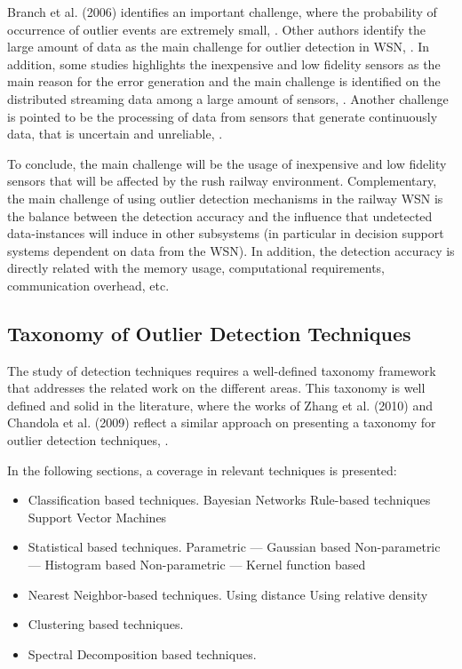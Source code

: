 Branch et al. (2006)  identifies an important challenge, where the probability of occurrence of outlier events are extremely small, \cite{class:branch:2006}. Other authors identify the large amount of data as the main challenge for outlier detection in WSN, \cite{nn:abid:2016, stat:sheng:2007}. In addition, some studies highlights the inexpensive and low fidelity sensors as the main reason for the error generation and the main challenge is identified on the distributed streaming data among a large amount of sensors, \cite{nn:zhuang:2006}. Another challenge is pointed to be  the processing of data from sensors that generate continuously data, that is uncertain and unreliable, \cite{stat:ghorbel:2015}. 

To conclude, the main challenge will be the usage of inexpensive and low fidelity sensors that will be affected by the rush railway environment. Complementary, the main challenge of using outlier detection mechanisms in the railway \ac{WSN} is the balance between the detection accuracy and the influence that undetected data-instances will induce in other subsystems (in particular in decision support systems dependent on data from the \ac{WSN}). In addition, the detection accuracy is directly related with the memory usage, computational requirements, communication overhead, etc. 


\subsection{Taxonomy of Outlier Detection Techniques}
\label{sec:taxon}
The study of detection techniques requires a well-defined taxonomy framework that addresses the related work on the different areas. 
This taxonomy is well defined and solid in the literature, where the works of Zhang et al. (2010) and Chandola et al. (2009) reflect a similar approach on presenting a taxonomy for outlier detection techniques, \cite{gen:zhang:2010, gen:chandola:2009}.

In the following sections, a coverage in relevant techniques is presented:

\begin{itemize}
	\setlength\itemsep{-0.5em}
	\item Classification based techniques.
	\subitem Bayesian Networks
	\subitem Rule-based techniques
	\subitem Support Vector Machines
	
	\item Statistical based techniques.
	\subitem Parametric --- Gaussian based
	\subitem Non-parametric --- Histogram based
	\subitem Non-parametric --- Kernel function based
	
	\item Nearest Neighbor-based techniques.
	\subitem Using distance
	\subitem Using relative density
	
	\item Clustering based techniques.
	
	\item Spectral Decomposition based techniques.
	
\end{itemize}

